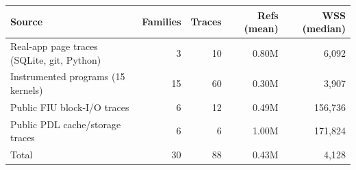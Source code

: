 \begin{tabular}{lrrrr}
\toprule
Source & Families & Traces & Refs (mean) & WSS (median) \\
\midrule
Real-app page traces (SQLite, git, Python) & 3 & 10 & 0.80M & 6,092 \\
Instrumented programs (15 kernels) & 15 & 60 & 0.30M & 3,907 \\
Public FIU block-I/O traces & 6 & 12 & 0.49M & 156,736 \\
Public PDL cache/storage traces & 6 & 6 & 1.00M & 171,824 \\
\midrule
Total & 30 & 88 & 0.43M & 4,128 \\
\bottomrule
\end{tabular}
